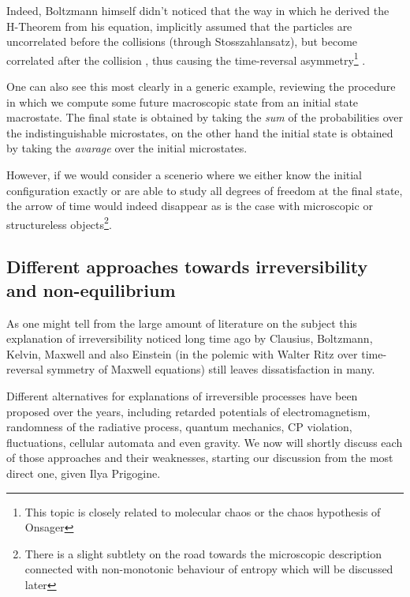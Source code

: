 \documentclass[a4paper,12pt]{article}
\begin{document}
Indeed, Boltzmann himself didn't noticed that the way in which he derived the H-Theorem from his equation, implicitly assumed that the particles are uncorrelated before the collisions (through Stosszahlansatz), but become correlated after the collision \cite{Schwabl:2002} \cite{Dorfman:ozm67-zD}, thus causing the time-reversal asymmetry\footnote{This topic is closely related to molecular chaos or the chaos hypothesis of Onsager} .

One can also see this most clearly in a generic example, reviewing the procedure in which we compute some future macroscopic state from an initial state macrostate. The final state is obtained by taking the \textit{sum} of the probabilities over the indistinguishable microstates, on the other hand the initial state is obtained by taking the \textit{avarage} over the initial microstates.

However, if we would consider a scenerio where we either know the initial configuration exactly or are able to study all degrees of freedom at the final state, the arrow of time would indeed disappear as is the case with microscopic or structureless objects\footnote{There is a slight subtlety on the road towards the microscopic description connected with non-monotonic behaviour of entropy which will be discussed later}.

\subsection{Different approaches towards irreversibility and non-equilibrium}

As one might tell from the large amount of literature on the subject \cite{Doyle:wf} \cite{Layzer:1970dx} \cite{Wolfram:552851} \cite{Rovelli:2015tv} \cite{Courbage:1983eo} %
this explanation of irreversibility noticed long time ago by Clausius, Boltzmann\cite{Wolfram:552851}, Kelvin, Maxwell\cite{Anonymous:0uVSJOI5} and also Einstein (in the polemic with Walter Ritz over time-reversal symmetry of Maxwell equations) still leaves dissatisfaction in many.

Different alternatives for explanations of irreversible processes have been proposed over the years, including retarded potentials of electromagnetism, randomness of the radiative process, quantum mechanics, CP violation, fluctuations, cellular automata and even gravity. We now will shortly discuss each of those approaches and their weaknesses, starting our discussion from the most direct one, given Ilya Prigogine.
\end{document}

